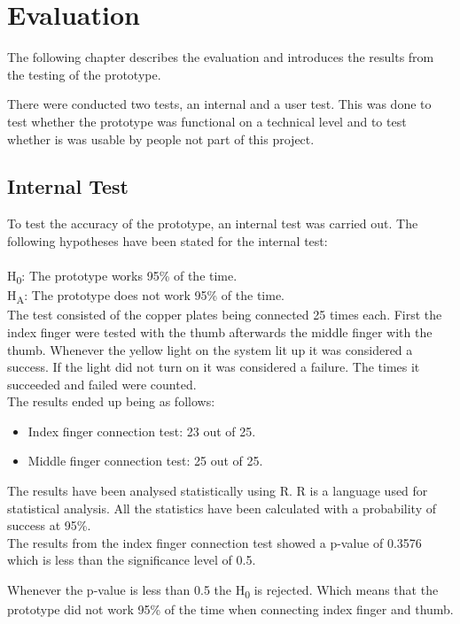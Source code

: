 \chapter{Evaluation}

The following chapter describes the evaluation and introduces the results from the testing of the prototype. 

There were conducted two tests, an internal and a user test. This was done to test whether the prototype was functional on a technical level and to test whether is was usable by people not part of this project. 


\section{Internal Test}

To test the accuracy of the prototype, an internal test was carried out. The following hypotheses have been stated for the internal test: \\\\
H\textsubscript{0}: The prototype works 95\% of the time.\\
H\textsubscript{A}: The prototype does not work 95\% of the time.\\

The test consisted of the copper plates being connected 25 times each. First the index finger were tested with the thumb afterwards the middle finger with the thumb. Whenever the yellow light on the system lit up it was considered a success. If the light did not turn on it was considered a failure. The times it succeeded and failed were counted.\\

The results ended up being as follows:
\begin{itemize}
\item Index finger connection test: 23 out of 25. 
\item Middle finger connection test: 25 out of 25.\\
\end{itemize}


The results have been analysed statistically using R\citep{R}. R is a language used for statistical analysis. All the statistics have been calculated with a probability of success at 95\%.\\
The results from the index finger connection test showed a p-value of 0.3576 which is less than the significance level of 0.5. 

Whenever the p-value is less than 0.5 the H\textsubscript{0} is rejected. Which means that the prototype did not work 95\% of the time when connecting index finger and thumb. \\

